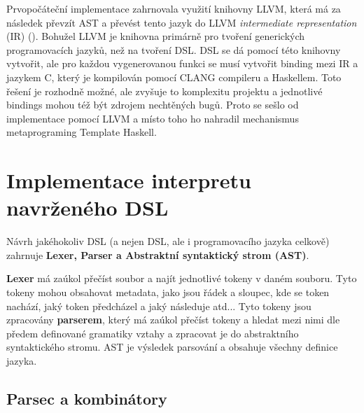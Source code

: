 \documentclass[male,czech]{kithesis}
\begin{document}
Prvopočáteční implementace zahrnovala využití knihovny LLVM,
která má za následek převzít AST a 
převést tento jazyk do LLVM \textit{intermediate representation} (IR) (\cite{IntroToLLVM}).
Bohužel LLVM je knihovna primárně pro tvoření generických programovacích jazyků, 
než na tvoření DSL. 
DSL se dá pomocí této knihovny vytvořit, 
ale pro každou vygenerovanou funkci se musí vytvořit binding mezi IR a
jazykem C, 
který je kompilován pomocí CLANG compileru a Haskellem. 
Toto řešení je rozhodně možné, 
ale zvyšuje to komplexitu projektu a 
jednotlivé bindings mohou též být zdrojem nechtěných bugů. 
Proto se sešlo od implementace pomocí LLVM a
místo toho ho nahradil mechanismus metaprograming Template Haskell.


\chapter{Implementace interpretu navrženého DSL}

Návrh jakéhokoliv DSL (a nejen DSL, ale i programovacího jazyka celkově) zahrnuje
\textbf{Lexer, Parser a Abstraktní syntaktický strom (AST)}.

\textbf{Lexer} má zaúkol přečíst soubor a 
najít jednotlivé tokeny v daném souboru.
Tyto tokeny mohou obsahovat metadata, 
jako jsou řádek a sloupec, 
kde se token nachází,
jaký token předcházel a jaký následuje atd... 
Tyto tokeny jsou zpracovány \textbf{parserem}, 
který má zaúkol přečíst tokeny a 
hledat mezi nimi dle předem definované gramatiky vztahy a 
zpracovat je do abstraktního syntaktického stromu. 
AST je výsledek parsování a 
obsahuje všechny definice jazyka.

{\begin{center}
\end{center}
}

\section{Parsec a kombinátory}
\end{document}
